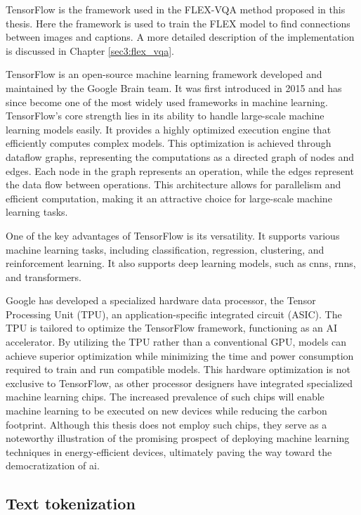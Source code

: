     TensorFlow is the framework used in the FLEX-VQA method proposed in this thesis. Here the framework is used to train the FLEX model to find connections between images and captions. A more detailed description of the implementation is discussed in Chapter \ref{sec3:flex_vqa}.

    
    TensorFlow is an open-source machine learning framework developed and maintained by the Google Brain team. It was first introduced in 2015 and has since become one of the most widely used frameworks in machine learning.
    TensorFlow's core strength lies in its ability to handle large-scale machine learning models easily. It provides a highly optimized execution engine that efficiently computes complex models. This optimization is achieved through dataflow graphs, representing the computations as a directed graph of nodes and edges. Each node in the graph represents an operation, while the edges represent the data flow between operations. This architecture allows for parallelism and efficient computation, making it an attractive choice for large-scale machine learning tasks.
    
    One of the key advantages of TensorFlow is its versatility. It supports various machine learning tasks, including classification, regression, clustering, and reinforcement learning. It also supports deep learning models, such as \glspl{cnn}, \glspl{rnn}, and transformers.

    
    
Google has developed a specialized hardware data processor, the Tensor Processing Unit (TPU), an application-specific integrated circuit (ASIC). The TPU is tailored to optimize the TensorFlow framework, functioning as an AI accelerator. By utilizing the TPU rather than a conventional GPU, models can achieve superior optimization while minimizing the time and power consumption required to train and run compatible models. This hardware optimization is not exclusive to TensorFlow, as other processor designers have integrated specialized machine learning chips. The increased prevalence of such chips will enable machine learning to be executed on new devices while reducing the carbon footprint. Although this thesis does not employ such chips, they serve as a noteworthy illustration of the promising prospect of deploying machine learning techniques in energy-efficient devices, ultimately paving the way toward the democratization of \gls{ai}.


    

    \subsection{Text tokenization}
    \label{sec2:text_tokenization}

